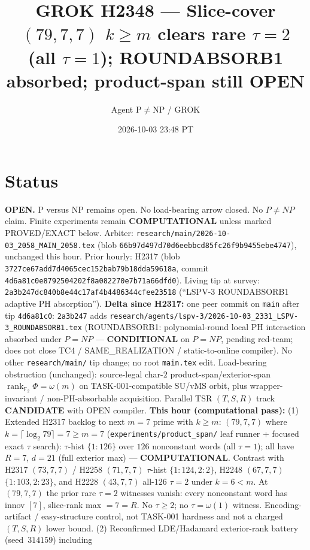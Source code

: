 \documentclass[11pt]{article}
\title{GROK H2348 --- Slice-cover $(79,7,7)$ $k{\ge}m$ clears rare $\tau{=}2$ (all $\tau{=}1$); ROUNDABSORB1 absorbed; product-span still OPEN}
\author{Agent P$\neq$NP / GROK}
\date{2026-10-03 23:48 PT}
\begin{document}
\maketitle

\section*{Status}
\textbf{OPEN.} P versus NP remains open. No load-bearing arrow closed. No $P\neq NP$ claim.
Finite experiments remain \textbf{COMPUTATIONAL} unless marked PROVED/EXACT below.
Arbiter: \texttt{research/main/2026-10-03\_2058\_MAIN\_2058.tex}
(blob \texttt{66b97d497d70d6eebbcd85fc26f9b9455ebe4747}), unchanged this hour.
Prior hourly: H2317 (blob \texttt{3727ce67add7d4065cec152bab79b18dda59618a}, commit \texttt{4d6a81c0e8792504202f8a082270e7b71a66dfd0}).
Living tip at survey: \texttt{2a3b247dc840b8e44c17af4b4486344cfee23518}
(``LSPV-3 ROUNDABSORB1 adaptive PH absorption'').
\textbf{Delta since H2317:} one peer commit on \texttt{main} after tip \texttt{4d6a81c0}:
\texttt{2a3b247} adds \texttt{research/agents/lspv-3/2026-10-03\_2331\_LSPV-3\_ROUNDABSORB1.tex}
(ROUNDABSORB1: polynomial-round local PH interaction absorbed under $P{=}NP$ ---
\textbf{CONDITIONAL} on $P{=}NP$, pending red-team; does not close TC4 / SAME\_REALIZATION /
static-to-online compiler). No other \texttt{research/main/} tip change; no root \texttt{main.tex} edit.
Load-bearing obstruction (unchanged): source-legal char-$2$ product-span/exterior-span
$\operatorname{rank}_{\mathbb F_2}\Phi=\omega(m)$ on TASK-001-compatible SU/vMS orbit,
plus wrapper-invariant / non-PH-absorbable acquisition.
Parallel TSR $(T,S,R)$ track \textbf{CANDIDATE} with OPEN compiler.
\textbf{This hour (computational pass):}
(1) Extended H2317 backlog to next $m{=}7$ prime with $k{\ge}m$:
$(79,7,7)$ where $k=\lceil\log_2 79\rceil=7{\ge}m{=}7$
(\texttt{experiments/product\_span/} leaf runner + focused exact $\tau$ search):
$\tau$-hist $\{1{:}126\}$ over $126$ nonconstant words (all $\tau{=}1$);
all have $R{=}7$, $d{=}21$ (full exterior max) --- \textbf{COMPUTATIONAL}.
Contrast with H2317 $(73,7,7)$ / H2258 $(71,7,7)$ $\tau$-hist $\{1{:}124,2{:}2\}$,
H2248 $(67,7,7)$ $\{1{:}103,2{:}23\}$, and H2228 $(43,7,7)$ all-$126$ $\tau{=}2$ under $k{=}6{<}m$.
At $(79,7,7)$ the prior rare $\tau{=}2$ witnesses vanish: every nonconstant word has
innov $[7]$, slice-rank max $=7{=}R$. No $\tau{\ge}2$; no $\tau=\omega(1)$ witness.
Encoding-artifact / easy-structure control, not TASK-001 hardness and not a charged $(T,S,R)$ lower bound.
(2) Reconfirmed LDE/Hadamard exterior-rank battery (seed~$314159$) including
\end{document}
